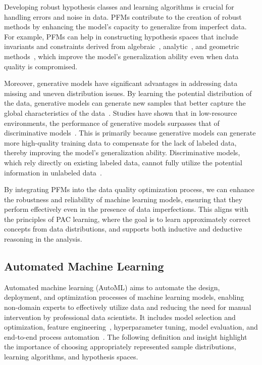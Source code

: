 Developing robust hypothesis classes and learning algorithms is crucial for handling errors and noise in data. PFMs contribute to the creation of robust methods by enhancing the model's capacity to generalize from imperfect data. For example, PFMs can help in constructing hypothesis spaces that include invariants and constraints derived from algebraic~\cite{Miao2022LearningIA}, analytic~\cite{Neu2022GeneralizationBV}, and geometric methods~\cite{Atzeni2023InfusingLS}, which improve the model's generalization ability even when data quality is compromised.

Moreover, generative models have significant advantages in addressing data missing and uneven distribution issues. By learning the potential distribution of the data, generative models can generate new samples that better capture the global characteristics of the data~\cite{094dai2017good}. Studies have shown that in low-resource environments, the performance of generative models surpasses that of discriminative models~\cite{097yoon2017semi}. This is primarily because generative models can generate more high-quality training data to compensate for the lack of labeled data, thereby improving the model's generalization ability. Discriminative models, which rely directly on existing labeled data, cannot fully utilize the potential information in unlabeled data~\cite{102yang2018deep}.

By integrating PFMs into the data quality optimization process, we can enhance the robustness and reliability of machine learning models, ensuring that they perform effectively even in the presence of data imperfections. This aligns with the principles of PAC learning, where the goal is to learn approximately correct concepts from data distributions, and supports both inductive and deductive reasoning in the analysis.

\subsection{Automated Machine Learning}\label{sec:auto_ml}

Automated machine learning (AutoML) aims to automate the design, deployment, and optimization processes of machine learning models, enabling non-domain experts to effectively utilize data and reducing the need for manual intervention by professional data scientists. It includes model selection and optimization, feature engineering~\cite{Hollmann2023LargeLM}, hyperparameter tuning, model evaluation, and end-to-end process automation~\cite{salehin2024automl}. The following definition and insight highlight the importance of choosing appropriately represented sample distributions, learning algorithms, and hypothesis spaces.

